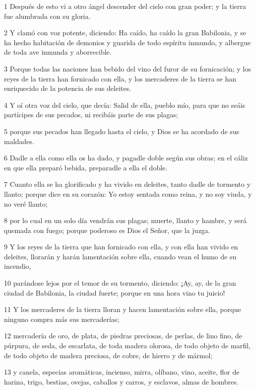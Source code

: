\par 1 Después de esto vi a otro ángel descender del cielo con gran poder; y la tierra fue alumbrada con su gloria.
\par 2 Y clamó con voz potente, diciendo: Ha caído, ha caído la gran Babilonia, y se ha hecho habitación de demonios y guarida de todo espíritu inmundo, y albergue de toda ave inmunda y aborrecible.
\par 3 Porque todas las naciones han bebido del vino del furor de su fornicación; y los reyes de la tierra han fornicado con ella, y los mercaderes de la tierra se han enriquecido de la potencia de sus deleites.
\par 4 Y oí otra voz del cielo, que decía: Salid de ella, pueblo mío, para que no seáis partícipes de sus pecados, ni recibáis parte de sus plagas;
\par 5 porque sus pecados han llegado hasta el cielo, y Dios se ha acordado de sus maldades.
\par 6 Dadle a ella como ella os ha dado, y pagadle doble según sus obras; en el cáliz en que ella preparó bebida, preparadle a ella el doble.
\par 7 Cuanto ella se ha glorificado y ha vivido en deleites, tanto dadle de tormento y llanto; porque dice en su corazón: Yo estoy sentada como reina, y no soy viuda, y no veré llanto;
\par 8 por lo cual en un solo día vendrán sus plagas; muerte, llanto y hambre, y será quemada con fuego; porque poderoso es Dios el Señor, que la juzga.
\par 9 Y los reyes de la tierra que han fornicado con ella, y con ella han vivido en deleites, llorarán y harán lamentación sobre ella, cuando vean el humo de su incendio,
\par 10 parándose lejos por el temor de su tormento, diciendo: ¡Ay, ay, de la gran ciudad de Babilonia, la ciudad fuerte; porque en una hora vino tu juicio!
\par 11 Y los mercaderes de la tierra lloran y hacen lamentación sobre ella, porque ninguno compra más sus mercaderías;
\par 12 mercadería de oro, de plata, de piedras preciosas, de perlas, de lino fino, de púrpura, de seda, de escarlata, de toda madera olorosa, de todo objeto de marfil, de todo objeto de madera preciosa, de cobre, de hierro y de mármol;
\par 13 y canela, especias aromáticas, incienso, mirra, olíbano, vino, aceite, flor de harina, trigo, bestias, ovejas, caballos y carros, y esclavos, almas de hombres.
